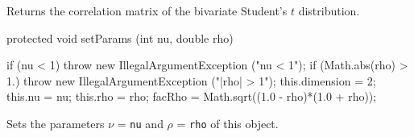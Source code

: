 \begin{tabb}
   Returns the correlation matrix of the bivariate Student's $t$ distribution.
\end{tabb}
\begin{code}

   protected void setParams (int nu, double rho) \begin{hide} {
      if (nu < 1)
         throw new IllegalArgumentException ("nu < 1");
      if (Math.abs(rho) > 1.)
         throw new IllegalArgumentException ("|rho| > 1");
      this.dimension = 2;
      this.nu = nu;
      this.rho = rho;
      facRho = Math.sqrt((1.0 - rho)*(1.0 + rho));
   }\end{hide}
\end{code}
  \begin{tabb} Sets the parameters $\nu$ = \texttt{nu} and
  $\rho$ = \texttt{rho} of this object.
  \end{tabb}
\begin{code}\begin{hide}
}\end{hide}
\end{code}
